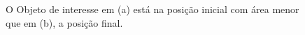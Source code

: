 \begin{figure}[H]
\centering
  \caption{O Objeto de interesse em (a) está na posição inicial com área menor que em (b), 
  a posição final.}
  \label{fig:target}
\end{figure}

